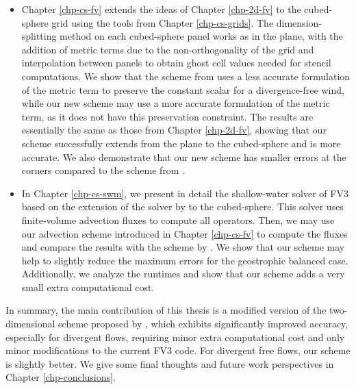 \begin{itemize}
\item Chapter \ref{chp-cs-fv} extends the ideas of Chapter \ref{chp-2d-fv} to the cubed-sphere grid using the tools from Chapter \ref{chp-cs-grids}.
The dimension-splitting method on each cubed-sphere panel works as in the plane, 
with the addition of metric terms due to the non-orthogonality of the grid and interpolation between panels to obtain ghost cell values needed for stencil computations. 
We show that the scheme from \citet{putman:2007} uses a less accurate formulation of the metric term to preserve the constant scalar for a divergence-free wind,
while our new scheme may use a more accurate formulation of the metric term, as it does not have this preservation constraint. 
The results are essentially the same as those from Chapter \ref{chp-2d-fv}, 
showing that our scheme successfully extends from the plane to the cubed-sphere and is more accurate. 
We also demonstrate that our new scheme has smaller errors at the corners compared to the scheme from \citet{putman:2007}.

\item In Chapter \ref{chp-cs-swm}, we present in detail the shallow-water solver of FV3
based on the extension of the solver by \citet{lin:1997} to the cubed-sphere.
This solver uses finite-volume advection fluxes to compute all operators.
Then, we may use our advection scheme introduced in Chapter \ref{chp-cs-fv} 
to compute the fluxes and compare the results with the scheme by \citet{putman:2007}.
We show that our scheme may help to slightly reduce the maximum errors for the geostrophic balanced case.
Additionally, we analyze the runtimes and show that our scheme adds a very small extra computational cost.
\end{itemize}

In summary, the main contribution of this thesis is a modified version of the two-dimensional scheme proposed by \citet{putman:2007}, 
which exhibits significantly improved accuracy, especially for divergent flows, requiring minor extra computational cost and only minor modifications to the current FV3 code.
For divergent free flows, our scheme is slightly better.
We give some final thoughts and future work perspectives in Chapter \ref{chp-conclusions}.